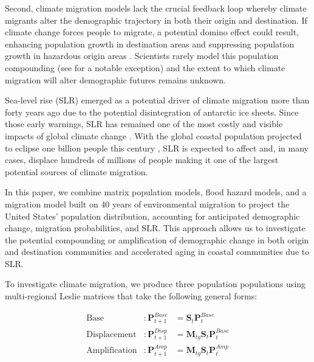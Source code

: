 \documentclass[12pt]{article}
\begin{document}
Second, climate migration models lack the crucial feedback loop whereby
climate migrants alter the demographic trajectory in both their origin
and destination. If climate change forces people to migrate, a potential
domino effect could result, enhancing population growth in destination
areas and suppressing population growth in hazardous origin areas
\citep{curtisUnderstandingDemographicImplications2011, hauer2020sea, marandi2021vulnerable}.
Scientists rarely model this population compounding (see
\citet{rigaud2018groundswell} for a notable exception) and the extent to
which climate migration will alter demographic futures remains unknown.

Sea-level rise (SLR) emerged as a potential driver of climate migration
more than forty years ago \citep{mercerWestAntarcticIce1978} due to the
potential disintegration of antarctic ice sheets. Since those early
warnings, SLR has remained one of the most costly and visible impacts of
global climate change
\citep{mcgranahanRisingTideAssessing2007, nichollsPlanningImpactsSea2011, straussCarbonChoicesDetermine2015}.
With the global coastal population projected to eclipse one billion
people this century \citep{neumannFutureCoastalPopulation2015}, SLR is
expected to affect and, in many cases, displace hundreds of millions of
people
\citep{hauerMigrationInducedSealevel2017, nichollsPlanningImpactsSea2011}
making it one of the largest potential sources of climate migration.

In this paper, we combine matrix population models, flood hazard models,
and a migration model built on 40 years of environmental migration to
project the United States' population distribution, accounting for
anticipated demographic change, migration probabilities, and SLR. This
approach allows us to investigate the potential compounding or
amplification of demographic change in both origin and destination
communities and accelerated aging in coastal communities due to SLR.

To investigate climate migration, we produce three population
populations using multi-regional Leslie matrices that take the following
general forms:

\[\begin{aligned}
\text{Base} &: \mathbf{P}_{t+1}^{Base} & =\mathbf{S}_t\mathbf{P}_t^{Base}\\
\text{Displacement}  &: \mathbf{P}_{t+1}^{Disp} &= \mathbf{M}_{ty}\mathbf{S}_{t}\mathbf{P}_t^{Base} \\
\text{Amplification} &: \mathbf{P}_{t+1}^{Amp}  &=\mathbf{M}_{ty}\mathbf{S}_{t}\mathbf{P}_t^{Amp} \label{eq:allmodels}
\end{aligned}\]
\end{document}
